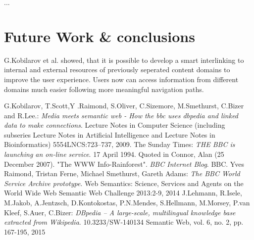 \documentclass{llncs}
\begin{document}
...

\section{Future Work \& conclusions}

G.Kobilarov et al. \cite{mmsw} showed, that it is possible to develop a smart interlinking to internal and external resources of previously seperated content domains to improve the user experience. Users now can access information from different domains much easier following more meaningful navigation paths.

%
%
\begin{thebibliography}{5}
%
  G.Kobilarov, T.Scott,Y .Raimond, S.Oliver, C.Sizemore, M.Smethurst, C.Bizer and R.Lee.:
  \textit{Media meets semantic web - How the bbc uses dbpedia and linked data to make connections}.
  Lecture Notes in Computer Science (including subseries Lecture Notes in Artiﬁcial Intelligence and Lecture Notes in Bioinformatics)
  5554LNCS:723–737, 2009.
%
  The Sunday Times:
  \textit{THE BBC is launching an on-line service}. 17 April 1994.
  Quoted in Connor, Alan (25 December 2007). "The WWW Info-Rainforest". \textit{BBC Internet Blog}. BBC.
%
  Yves Raimond, Tristan Ferne, Michael Smethurst, Gareth Adams:
  \textit{The BBC World Service Archive prototype}.
  Web Semantics: Science, Services and Agents on the World Wide Web
  Semantic Web Challenge 2013:2-9, 2014
%
  J.Lehmann, R.Isele, M.Jakob, A.Jentzsch, D.Kontokostas, P.N.Mendes, S.Hellmann, M.Morsey, P.van Kleef, S.Auer, C.Bizer:
  \textit{DBpedia – A large-scale, multilingual knowledge base extracted from Wikipedia}.
  10.3233/SW-140134
  Semantic Web, vol. 6, no. 2, pp. 167-195, 2015
%
\end{thebibliography}
\end{document}
